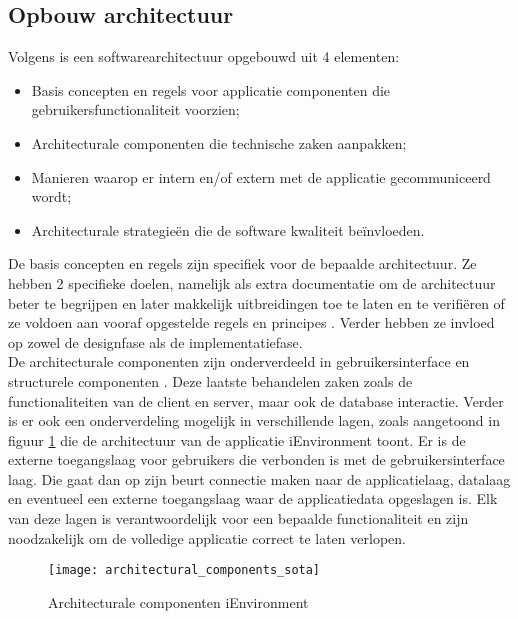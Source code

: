 \subsection{Opbouw architectuur}
Volgens \textcite{Solms2012} is een softwarearchitectuur opgebouwd uit 4 elementen:
\begin{itemize}
    \item Basis concepten en regels voor applicatie componenten die gebruikersfunctionaliteit voorzien;
    \item Architecturale componenten die technische zaken aanpakken;
    \item Manieren waarop er intern en/of extern met de applicatie gecommuniceerd wordt;
    \item Architecturale strategieën die de software kwaliteit beïnvloeden.
\end{itemize}


De basis concepten en regels zijn specifiek voor de bepaalde architectuur. Ze hebben 2 specifieke doelen, namelijk als extra documentatie om de architectuur beter te begrijpen en later makkelijk uitbreidingen toe te laten en te verifiëren of ze voldoen aan vooraf opgestelde regels en principes \autocite{Oussalah2013}. Verder hebben ze invloed op zowel de designfase als de implementatiefase.\\

De architecturale componenten zijn onderverdeeld in gebruikersinterface en structurele componenten \autocite{EDUCBA2023}. Deze laatste behandelen zaken zoals de functionaliteiten van de client en server, maar ook de database interactie. Verder is er ook een onderverdeling mogelijk in verschillende lagen, zoals aangetoond in figuur \ref{architectural_components_sota} die de architectuur van de applicatie iEnvironment toont. Er is de externe toegangslaag voor gebruikers die verbonden is met de gebruikersinterface laag. Die gaat dan op zijn beurt connectie maken naar de applicatielaag, datalaag en eventueel een externe toegangslaag waar de applicatiedata opgeslagen is. Elk van deze lagen is verantwoordelijk voor een bepaalde functionaliteit en zijn noodzakelijk om de volledige applicatie correct te laten verlopen.

\begin{figure}[ht]
    \texttt{[image: architectural\_components\_sota]}
    \centering
    \caption{Architecturale componenten iEnvironment \autocite{Alencar2018}}
    \label{architectural_components_sota}
\end{figure}

